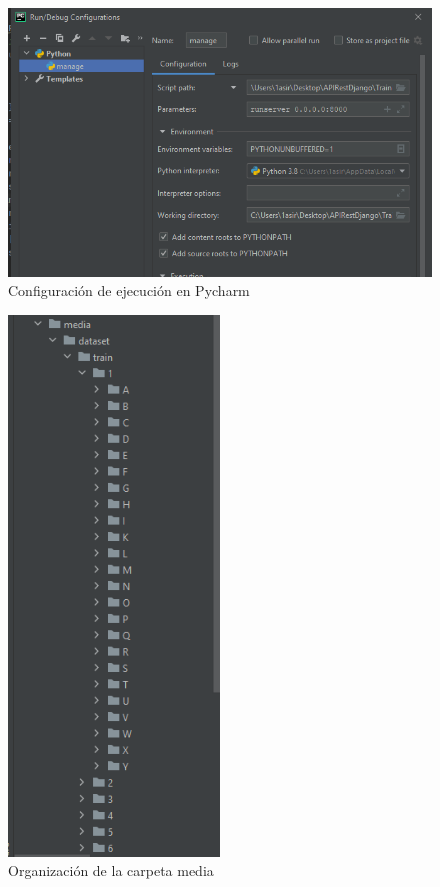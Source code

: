 \documentclass[../main.tex]{subfiles}
\begin{document}
\begin{figure}[h]
\centering 
\includegraphics[width=1\textwidth]{images/apirest/api1.PNG}
\caption{Configuración de ejecución en Pycharm}
\label{figure2}
\end{figure}

\begin{figure}[h]
\centering 
\includegraphics[width=0.5\textwidth]{images/apirest/api7.PNG}
\caption{Organización de la carpeta media}
\label{figure3}
\end{figure}
\end{document}
